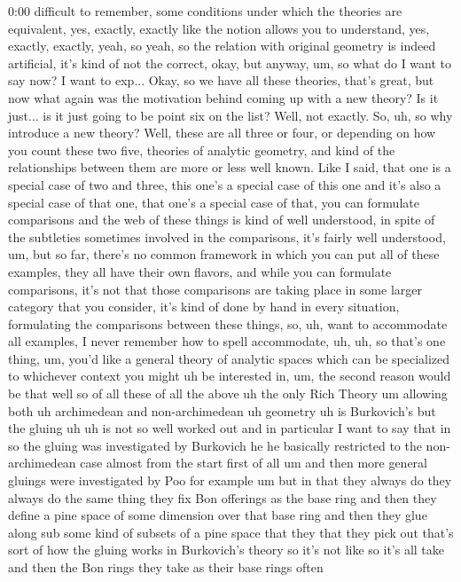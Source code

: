 \begin{unfinished}{0:00}
difficult to remember, some conditions under which the theories are equivalent, yes, exactly, exactly like the notion allows you to understand, yes, exactly, exactly, yeah, so yeah, so the relation with original geometry is indeed artificial, it's kind of not the correct, okay, but anyway, um, so what do I want to say now? I want to exp... Okay, so we have all these theories, that's great, but now what again was the motivation behind coming up with a new theory? Is it just... is it just going to be point six on the list? Well, not exactly. So, uh, so why introduce a new theory? Well, these are all three or four, or depending on how you count these two five, theories of analytic geometry, and kind of the relationships between them are more or less well known. Like I said, that one is a special case of two and three, this one's a special case of this one and it's also a special case of that one, that one's a special case of that, you can formulate comparisons and the web of these things is kind of well understood, in spite of the subtleties sometimes involved in the comparisons, it's fairly well understood, um, but so far, there's no common framework in which you can put all of these examples, they all have their own flavors, and while you can formulate comparisons, it's not that those comparisons are taking place in some larger category that you consider, it's kind of done by hand in every situation, formulating the comparisons between these things, so, uh, want to accommodate all examples, I never remember how to spell accommodate, uh, uh, so that's one thing, um, you'd like a general theory of analytic spaces which can be specialized to whichever context you might uh be interested in, um, the second reason would be that well so of all these of all the above uh the only Rich Theory um allowing both uh archimedean and non-archimedean uh geometry uh is Burkovich's but the gluing uh uh is not so well worked out and in particular I want to say that in so the gluing was investigated by Burkovich he he basically restricted to the non-archimedean case almost from the start first of all um and then more general gluings were investigated by Poo for example um but in that they always do they always do the same thing they fix Bon offerings as the base ring and then they define a pine space of some dimension over that base ring and then they glue along sub some kind of subsets of a pine space that they that they pick out that's sort of how the gluing works in Burkovich's theory so it's not like so it's all take and then the Bon rings they take as their base rings often


\end{unfinished}
